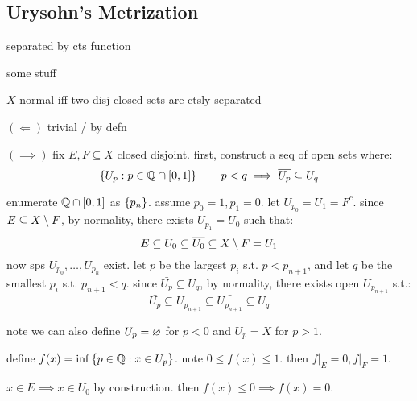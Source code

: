 \subsection{Urysohn's Metrization}

\begin{defn}
    separated by cts function
\end{defn}

some stuff

\begin{lm}[title=Urysohn's Lemma]
    $X$ normal iff two disj closed sets are ctsly separated
\end{lm}

\begin{pf}[source=Primary Source Material]
    $(\Longleftarrow)$ trivial / by defn

    $(\implies)$ fix $E,F\subseteq X$ closed disjoint.
    first, construct a seq of open sets where:
    \begin{equation*}
        \left\{{U_{p}:p\in\mathbb{Q}\cap[0,1]}\right\} \qquad p<q\implies\overline{U_{p}}\subseteq U_{q}
    \end{equation*}
    \begin{block}
        enumerate $\mathbb{Q}\cap[0,1]$ as $\left\{{p_{n}}\right\}$.
        assume $p_{0}=1,p_{1}=0$. let $U_{p_{0}}=U_{1}=F^{c}$.
        since $E\subseteq X\setminus F$, by normality, there exists $U_{p_{1}}=U_{0}$
        such that:
        \begin{equation*}
            E\subseteq U_{0}\subseteq\overline{U_{0}}\subseteq X\setminus F=U_{1}
        \end{equation*}
        now sps $U_{p_{0}},\dots,U_{p_{n}}$ exist.
        let $p$ be the largest $p_{i}$ s.t. $p<p_{n+1}$, and
        let $q$ be the smallest $p_{i}$ s.t. $p_{n+1}<q$.
        since $\bar{U_{p}}\subseteq U_{q}$, by normality, there exists open
        $U_{p_{n+1}}$ s.t.:
        \begin{equation*}
            \bar{U_{p}}\subseteq U_{p_{n+1}}\subseteq\bar{U_{p_{n+1}}}
            \subseteq U_{q}
        \end{equation*}
    \end{block}
    note we can also define $U_{p}=\varnothing$ for $p<0$ and $U_{p}=X$ for $p>1$.

    define $f(x)=\inf\left\{{p\in\mathbb{Q}:x\in U_{p}}\right\}$. note $0\leq f(x)\leq1$.
    then $f\rvert_{E}=0,f\rvert_{F}=1$.
    \begin{block}
        $x\in E\implies x\in U_{0}$ by construction.
        then $f(x)\leq0\implies f(x)=0$.


\end{block}
\end{pf}
